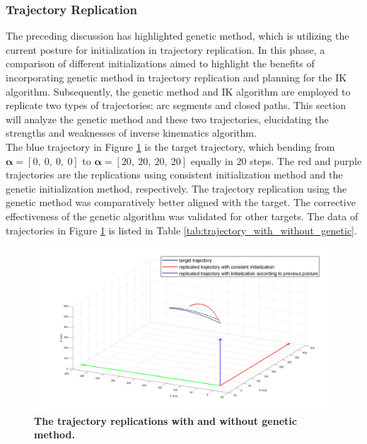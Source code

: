 \subsubsection{Trajectory Replication}
The preceding discussion has highlighted genetic method, which is utilizing the current posture for 
initialization in trajectory replication. In this phase, a comparison of different initializations aimed to 
highlight the benefits of incorporating genetic method in trajectory replication and planning for the IK 
algorithm. Subsequently, the genetic method and IK algorithm are employed to 
replicate two types of trajectories: arc segments and closed paths. This section will analyze the genetic 
method and these two trajectories, elucidating the strengths and weaknesses of inverse kinematics algorithm. \\
The blue trajectory in Figure \ref{fig:genetic_approach} is the target trajectory, which bending from 
$\boldsymbol{\alpha} = [0,\ 0,\ 0,\ 0]$ to $\boldsymbol{\alpha} = [20,\ 20,\ 20,\ 20]$ equally in 20 steps. 
The red and purple trajectories are the replications using consistent initialization method and the genetic 
initialization method, respectively. The trajectory replication using the genetic method was comparatively better 
aligned with the target. The corrective effectiveness of the genetic algorithm was validated for 
other targets. The data of trajectories in Figure \ref{fig:genetic_approach} is listed in Table 
\ref{tab:trajectory_with_without_genetic}.
\begin{figure}[H] %
    \centering 
    \captionsetup{labelsep=colon}
    \includegraphics[width=1.0\textwidth]{Image/Result/trajectory_replication_diff_initialization.png} 
    \caption[The trajectory replications with and without genetic method]
    {\centering \textbf{The trajectory replications with and without genetic method.}}
    \label{fig:genetic_approach}
\end{figure}
